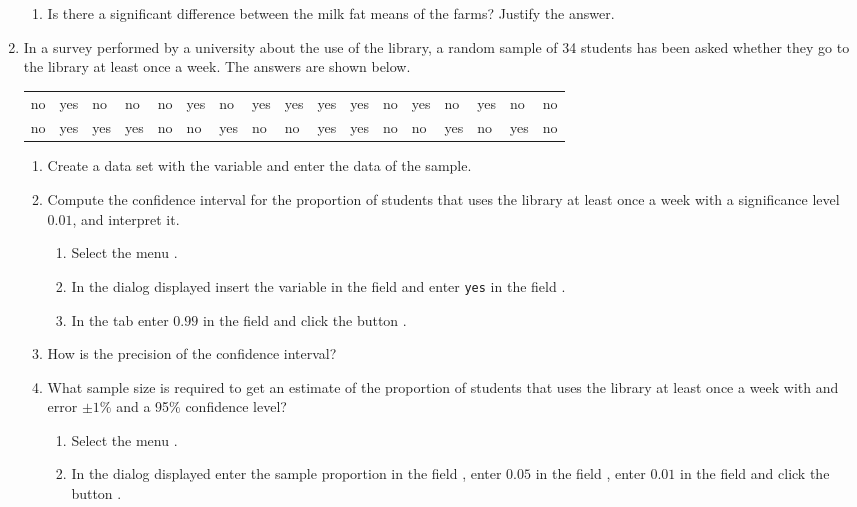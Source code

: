 \begin{enumerate}[leftmargin=*]
\begin{enumerate}
\item Is there a significant difference between the milk fat means of the farms?
Justify the answer. 
\end{enumerate}


\item In a survey performed by a university about the use of the library, a random sample of 34 students has been asked
whether they go to the library at least once a week.
The answers are shown below. 
\begin{center}
\begin{tabular}{lllllllllllllllll}
no & yes & no & no & no & yes & no & yes & yes & yes & yes & no & yes & no & yes & no & no \\
no & yes & yes & yes & no & no & yes & no & no & yes & yes & no & no & yes & no & yes & no \\
\end{tabular}
\end{center}

\begin{enumerate}
\item Create a data set with the variable  and enter the data of the sample.
\item Compute the confidence interval for the proportion of students that uses the library at least once a week with a
significance level $0.01$, and interpret it. 
\begin{indication}
\begin{enumerate}
\item Select the menu .
\item In the dialog displayed insert the variable  in the field  and enter \texttt{yes}
in the field .
\item In the  tab enter $0.99$ in the field  and click the button .
\end{enumerate}
\end{indication}

\item How is the precision of the confidence interval?

\item What sample size is required to get an estimate of the proportion of students that uses the library at least once
a week with and error $\pm 1\%$ and a 95\% confidence level?
\begin{indication}
\begin{enumerate}
\item Select the menu .
\item In the dialog displayed enter the sample proportion in the field , enter $0.05$ in the field
, enter $0.01$ in the field  and click the button .
\end{enumerate}
\end{indication}
\end{enumerate}



\end{enumerate}
